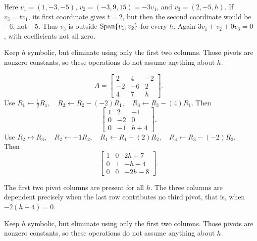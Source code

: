 Here $v_1=(1,-3,-5)$, $v_2=(-3,9,15)=-3v_1$,
and $v_3=(2,-5,h)$.
If $v_3=tv_1$, its first coordinate gives $t=2$, but then the
second coordinate would be $-6$, not $-5$. Thus $v_3$ is outside
$\operatorname{Span}\{v_1,v_2\}$ for every $h$.
Again $3v_1+v_2+0v_3=0$, with coefficients not all zero.



\idea Keep $h$ symbolic, but eliminate using only the first two columns. Those pivots are nonzero constants, so these operations do not assume anything about $h$.

\[ A=\begin{bmatrix}2 & 4 & -2\\-2 & -6 & 2\\4 & 7 & h\end{bmatrix}.\]
Use $R_{1}\leftarrow \frac{1}{2}R_{1},\quad R_{2}\leftarrow R_{2}-(-2)R_{1},\quad R_{3}\leftarrow R_{3}-(4)R_{1}$. Then
\[ \begin{bmatrix}1 & 2 & -1\\0 & -2 & 0\\0 & -1 & h + 4\end{bmatrix}.\]
Use $R_{2}\leftrightarrow R_{3},\quad R_{2}\leftarrow -1R_{2},\quad R_{1}\leftarrow R_{1}-(2)R_{2},\quad R_{3}\leftarrow R_{3}-(-2)R_{2}$. Then
\[ \begin{bmatrix}1 & 0 & 2 h + 7\\0 & 1 & - h - 4\\0 & 0 & - 2 h - 8\end{bmatrix}.\]

The first two pivot columns are present for all $h$. The three columns are dependent precisely when the last row contributes no third pivot, that is, when $- 2 \left(h + 4\right)=0$.




\idea Keep $h$ symbolic, but eliminate using only the first two columns. Those pivots are nonzero constants, so these operations do not assume anything about $h$.

